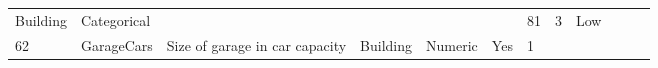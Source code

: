 \documentclass[11pt]{article}
\begin{document}
\begin{longtable}[]{@{}llllllllllll@{}}
\begin{minipage}[t]{0.04\columnwidth}
Building\strut
\end{minipage} & \begin{minipage}[t]{0.04\columnwidth}\raggedright\strut
Categorical\strut
\end{minipage} & \begin{minipage}[t]{0.04\columnwidth}\raggedright\strut
\strut
\end{minipage} & \begin{minipage}[t]{0.04\columnwidth}\raggedright\strut
\strut
\end{minipage} & \begin{minipage}[t]{0.04\columnwidth}\raggedright\strut
\strut
\end{minipage} & \begin{minipage}[t]{0.04\columnwidth}\raggedright\strut
\strut
\end{minipage} & \begin{minipage}[t]{0.04\columnwidth}\raggedright\strut
81\strut
\end{minipage} & \begin{minipage}[t]{0.04\columnwidth}\raggedright\strut
3\strut
\end{minipage} & \begin{minipage}[t]{0.04\columnwidth}\raggedright\strut
Low\strut
\end{minipage}\tabularnewline
\begin{minipage}[t]{0.04\columnwidth}\raggedright\strut
62\strut
\end{minipage} & \begin{minipage}[t]{0.04\columnwidth}\raggedright\strut
GarageCars\strut
\end{minipage} & \begin{minipage}[t]{0.04\columnwidth}\raggedright\strut
Size of garage in car capacity\strut
\end{minipage} & \begin{minipage}[t]{0.04\columnwidth}\raggedright\strut
Building\strut
\end{minipage} & \begin{minipage}[t]{0.04\columnwidth}\raggedright\strut
Numeric\strut
\end{minipage} & \begin{minipage}[t]{0.04\columnwidth}\raggedright\strut
Yes\strut
\end{minipage} & \begin{minipage}[t]{0.04\columnwidth}\raggedright\strut
1\strut
\end{minipage} & \begin{minipage}[t]{0.04\columnwidth}\raggedright\strut

\end{minipage}
\end{longtable}
\end{document}
